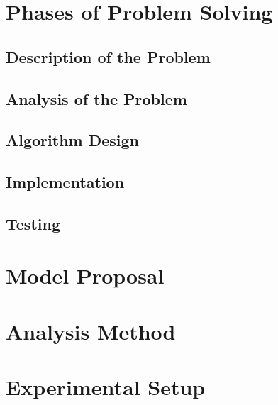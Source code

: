     \section{Phases of Problem Solving}
    
    \subsection{Description of the Problem}
    
    \subsection{Analysis of the Problem}
    
    \subsection{Algorithm Design}
    
    \subsection{Implementation}
    
    \subsection{Testing}

\section{Model Proposal}

\section{Analysis Method}

\section{Experimental Setup}
